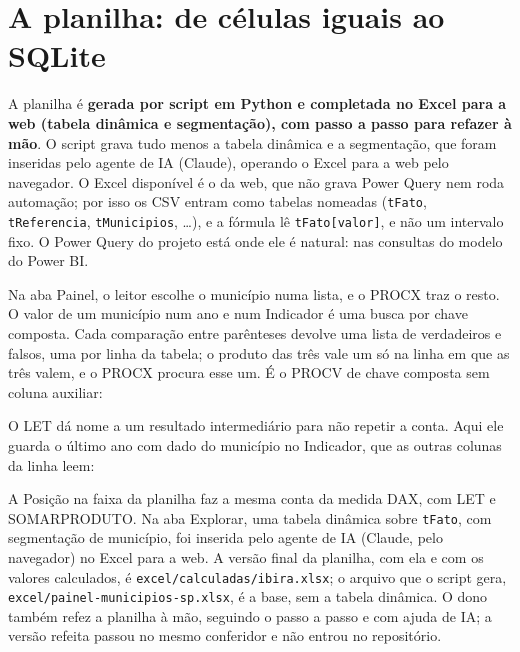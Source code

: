 \documentclass[11pt,a4paper]{article}
\newenvironment{codigo}
  {\par\smallskip\begin{lrbox}{\codigocaixa}\begin{minipage}{1.2\linewidth}\footnotesize}
  {\end{minipage}\end{lrbox}\noindent\makebox[\linewidth][l]{\usebox{\codigocaixa}}\par\smallskip}
\begin{document}
\section{A planilha: \NumCelulasExcelBatem{} de \NumCelulasExcel{} células iguais ao SQLite}
\label{sec:planilha}

A planilha é \textbf{gerada por script em Python e completada no Excel
para a web (tabela dinâmica e segmentação), com passo a passo para refazer
à mão}. O script grava tudo menos a tabela dinâmica e a segmentação, que
foram inseridas pelo agente de IA (Claude), operando o Excel para a web pelo
navegador. O Excel disponível é o da web, que não grava Power Query nem roda
automação; por isso os CSV entram como tabelas nomeadas (\texttt{tFato},
\texttt{tReferencia}, \texttt{tMunicipios}, \ldots), e a fórmula lê
\texttt{tFato[valor]}, e não um intervalo fixo. O Power Query do projeto
está onde ele é natural: nas consultas do modelo do Power BI.

Na aba Painel, o leitor escolhe o município numa lista, e o PROCX traz o
resto. O valor de um município num ano e num Indicador é uma busca por
chave composta. Cada comparação entre parênteses devolve uma lista de
verdadeiros e falsos, uma por linha da tabela; o produto das três vale um
só na linha em que as três valem, e o PROCX procura esse um. É o PROCV de
chave composta sem coluna auxiliar:

\begin{codigo}\end{codigo}

O LET dá nome a um resultado intermediário para não repetir a conta. Aqui
ele guarda o último ano com dado do município no Indicador, que as outras
colunas da linha leem:

\begin{codigo}\end{codigo}

A Posição na faixa da planilha faz a mesma conta da medida DAX, com LET e
SOMARPRODUTO. Na aba Explorar, uma tabela dinâmica sobre \texttt{tFato},
com segmentação de município, foi inserida pelo agente de IA (Claude, pelo
navegador) no Excel para a web. A versão final da planilha, com ela e com
os valores calculados, é \texttt{excel/calculadas/ibira.xlsx}; o arquivo
que o script gera, \texttt{excel/painel-municipios-sp.xlsx}, é a base, sem
a tabela dinâmica. O dono também refez a planilha à mão, seguindo o passo
a passo e com ajuda de IA; a versão refeita passou no mesmo conferidor e
não entrou no repositório.
\end{document}
